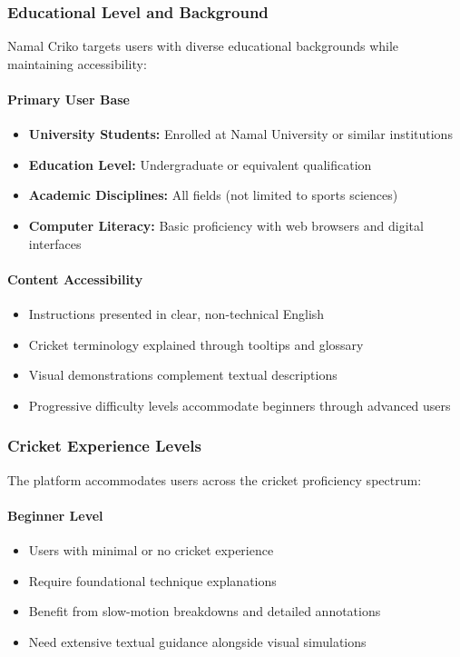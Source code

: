 \documentclass[12pt,a4paper]{article}
\begin{document}
\begin{enumerate}
\subsubsection{Educational Level and Background}
Namal Criko targets users with diverse educational backgrounds while maintaining accessibility:

\paragraph{Primary User Base}
\begin{itemize}
    \item \textbf{University Students:} Enrolled at Namal University or similar institutions
    \item \textbf{Education Level:} Undergraduate or equivalent qualification
    \item \textbf{Academic Disciplines:} All fields (not limited to sports sciences)
    \item \textbf{Computer Literacy:} Basic proficiency with web browsers and digital interfaces
\end{itemize}

\paragraph{Content Accessibility}
\begin{itemize}
    \item Instructions presented in clear, non-technical English
    \item Cricket terminology explained through tooltips and glossary
    \item Visual demonstrations complement textual descriptions
    \item Progressive difficulty levels accommodate beginners through advanced users
\end{itemize}

\subsubsection{Cricket Experience Levels}
The platform accommodates users across the cricket proficiency spectrum:

\paragraph{Beginner Level}
\begin{itemize}
    \item Users with minimal or no cricket experience
    \item Require foundational technique explanations
    \item Benefit from slow-motion breakdowns and detailed annotations
    \item Need extensive textual guidance alongside visual simulations
\end{itemize}


\end{enumerate}
\end{document}
